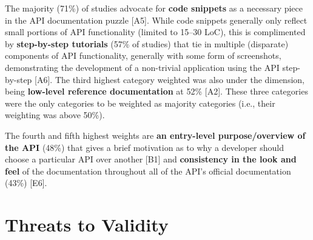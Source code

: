 The majority (71\%) of studies advocate for \textbf{code snippets} as a necessary piece in the API documentation puzzle [A5]. While code snippets generally only reflect small portions of API functionality (limited to 15--30 LoC), this is complimented by \textbf{step-by-step tutorials} (57\% of studies) that tie in multiple (disparate) components of API functionality, generally with some form of screenshots, demonstrating the development of a non-trivial application using the API step-by-step [A6]. The third highest category weighted was also under the \dima{} dimension, being \textbf{low-level reference documentation} at 52\% [A2]. These three categories were the only categories to be weighted as majority categories (i.e., their weighting was above 50\%).

The fourth and fifth highest weights are \textbf{an entry-level purpose/overview of the API} (48\%) that gives a brief motivation as to why a developer should choose a particular API over another [B1] and \textbf{consistency in the look and feel} of the documentation throughout all of the API's official documentation (43\%) [E6].



 
\section{Threats to Validity}
\label{esem2019:sec:limitations}

